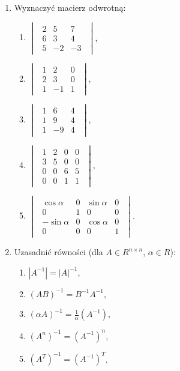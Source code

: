 \documentclass{article}
\begin{document}
\begin{enumerate}
    \item Wyznaczyć macierz odwrotną:
        \begin{enumerate}
            \item $\begin{vmatrix}\begin{array}{rrr} 2 & 5 & 7\\ 6 & 3 & 4\\ 5 & -2 & -3 \end{array}\end{vmatrix}$,
            \item $\begin{vmatrix}\begin{array}{rrr} 1 & 2 & 0\\ 2 & 3 & 0\\ 1 & -1 & 1 \end{array}\end{vmatrix}$,
            \item $\begin{vmatrix}\begin{array}{rrr} 1 & 6 & 4\\ 1 & 9 & 4\\ 1 & -9 & 4 \end{array}\end{vmatrix}$,
            \item $\begin{vmatrix}\begin{array}{rrrr} 1 & 2 & 0 & 0\\ 3 & 5 & 0 & 0\\ 0 & 0 & 6 & 5\\ 0 & 0 & 1 & 1 \end{array} \end{vmatrix}$,
            \item $\begin{vmatrix}\begin{array}{rrrr} \cos{\alpha} & 0 & \sin{\alpha} & 0\\ 0 & 1 & 0 & 0\\ -\sin{\alpha} & 0 & \cos{\alpha} & 0\\ 0 & 0 & 0 & 1 \end{array} \end{vmatrix}$.
        \end{enumerate}

    \item Uzasadnić równości (dla $A \in R^{n \times n}$, $\alpha \in R$):
        \begin{enumerate}
            \item $|A^{-1}| = |A|^{-1}$,
            \item $(AB)^{-1} = B^{-1}A^{-1}$,
            \item $(\alpha A)^{-1} = \frac{1}{\alpha}( A^{-1} )$,
            \item $(A^{n})^{-1} = (A^{-1})^{n}$,
            \item $(A^{T})^{-1}=(A^{-1})^{T}$.
        \end{enumerate}
\end{enumerate}
\end{document}

